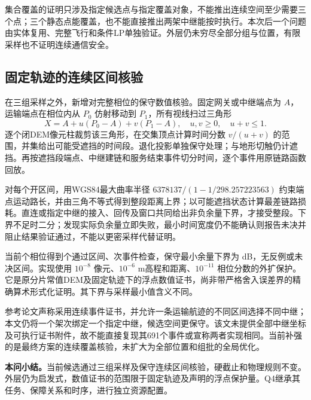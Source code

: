 集合覆盖的证明只涉及指定候选点与指定覆盖对象，不能推出连续空间至少需要三个点；三个静态点能覆盖，也不能直接推出两架中继能按时执行。本次后一个问题由实体复用、完整飞行和条件LP单独验证。外层仍未穷尽全部分组与位置，有限采样也不证明连续通信安全。

\subsection{固定轨迹的连续区间核验}
在三组采样之外，新增对完整相位的保守数值核验。固定网关或中继端点为 $A$，运输端点在相位内从 $P_0$ 仿射移动到 $P_1$，所有视线扫过三角形
\begin{equation}
X=A+u(P_0-A)+v(P_1-A),\quad u,v\ge0,\quad u+v\le1.
\end{equation}
逐个闭DEM像元柱裁剪该三角形，在交集顶点计算时间分数 $v/(u+v)$ 的范围，并集给出可能受遮挡的时间段。退化投影单独保守处理；与地形切触仍计遮挡。再按遮挡段端点、中继建链和服务结束事件切分时间，逐个事件用原链路函数回放。

对每个开区间，用WGS84最大曲率半径 $6378137/(1-1/298.257223563)$ 约束端点运动路长，并由三角不等式得到整段距离上界；以可能遮挡状态计算最差链路损耗。直连或指定中继的接入、回传及窗口共同给出非负余量下界，才接受整段。下界不足时二分；发现实际负余量立即失败，最小时间宽度仍不能确认则报告未决并阻止结果验证通过，不能以更密采样代替证明。

当前\ContinuousPhases{}个相位得到\ContinuousCells{}个通过区间、\ContinuousEvents{}次事件检查，保守最小余量下界为\ContinuousMargin{} dB，无反例或未决区间。实现使用 $10^{-8}$ 像元、$10^{-6}$ m高程和距离、$10^{-11}$ 相位分数的外扩保护。它是原分片常值DEM及固定轨迹下的浮点数值证书，尚非带严格舍入误差界的精确算术形式化证明。其下界与采样最小值含义不同。

参考论文声称采用连续事件证书，并允许一条运输航迹的不同区间选择不同中继；本文仍将一个架次绑定一个指定中继，候选空间更保守。该文未提供全部中继坐标及可执行证书附件，故不能直接复现其691个事件或宣称两者实现相同。当前补强的是最终方案的连续覆盖核验，未扩大为全部位置和组批的全局优化。

\textbf{本问小结。}当前候选通过三组采样及保守连续区间核验，硬截止和物理规则不变。外层仍为启发式，数值证书的范围限于固定轨迹及声明的浮点保护量。Q4继承其任务、保障关系和时序，进行独立资源配置。
\FloatBarrier
